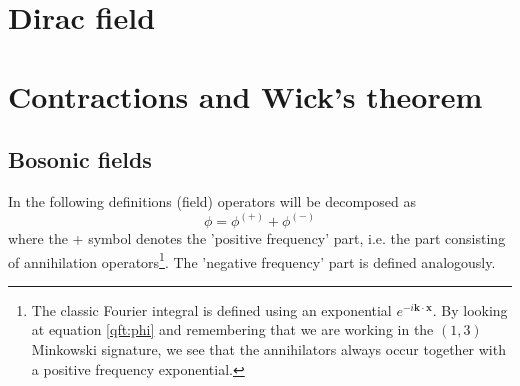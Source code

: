 \section{Dirac field}

	

\section{Contractions and Wick's theorem}
\subsection{Bosonic fields}
	
	In the following definitions (field) operators will be decomposed as
	\[\phi = \phi^{(+)} + \phi^{(-)}\]
	where the + symbol denotes the 'positive frequency' part, i.e. the part consisting of annihilation operators\footnote{The classic Fourier integral is defined using an exponential $e^{-i\mathbf{k\cdot x}}$. By looking at equation \ref{qft:phi} and remembering that we are working in the $(1, 3)$ Minkowski signature, we see that the annihilators always occur together with a positive frequency exponential.}. The 'negative frequency' part is defined analogously.

	
	
